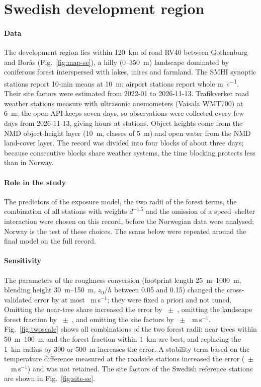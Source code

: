 \appendix
\section{Swedish development region}
\label{app:sweden}

\paragraph{Data} The development region lies within \SI{120}{km} of road RV40 between Gothenburg and Borås (Fig.~\ref{fig:map-se}), a hilly (0--\SI{350}{m}) landscape dominated by coniferous forest interspersed with lakes, mires and farmland. The \seRef{} SMHI synoptic stations report 10-min means at \SI{10}{m}; airport stations report whole \si{m.s^{-1}}. Their site factors were estimated from 2022-01 to 2026-11-13. Trafikverket road weather stations measure with ultrasonic anemometers (Vaisala WMT700) at \SI{6}{m}; the open API keeps seven days, so observations were collected every few days from 2026-11-13, giving \seHours{} hours at \seTrv{} stations. Object heights come from the NMD object-height layer (\SI{10}{m}, classes of \SI{5}{m}) and open water from the NMD land-cover layer. The record was divided into four blocks of about three days; because consecutive blocks share weather systems, the time blocking protects less than in Norway.

\paragraph{Role in the study} The predictors of the exposure model, the two radii of the forest terms, the combination of all stations with weights $d^{-1.5}$ and the omission of a speed--shelter interaction were chosen on this record, before the Norwegian data were analysed; Norway is the test of these choices. The scans below were repeated around the final model on the full record.

\paragraph{Sensitivity} The parameters of the roughness conversion (footprint length \SIrange{25}{1000}{m}, blending height \SIrange{30}{150}{m}, $z_0/h$ between 0.05 and 0.15) changed the cross-validated error by at most \sePhysMax~m\,s$^{-1}$; they were fixed a priori and not tuned. Omitting the near-tree share increased the error by \seNoTree~$\pm$~\seNoTreeSE, omitting the landscape forest fraction by \seFarNone~$\pm$~\seFarNoneSE, and omitting the site factors by \seSiteNone~$\pm$~\seSiteNoneSE~m\,s$^{-1}$. Fig.~\ref{fig:twoscale} shows all combinations of the two forest radii: near trees within \SIrange{50}{100}{m} and the forest fraction within \SI{1}{km} are best, and replacing the \SI{1}{km} radius by 300 or \SI{500}{m} increases the error. A stability term based on the temperature difference measured at the roadside stations increased the error (\seStab~$\pm$~\seStabSE~m\,s$^{-1}$) and was not retained. The site factors of the Swedish reference stations are shown in Fig.~\ref{fig:site-se}.

